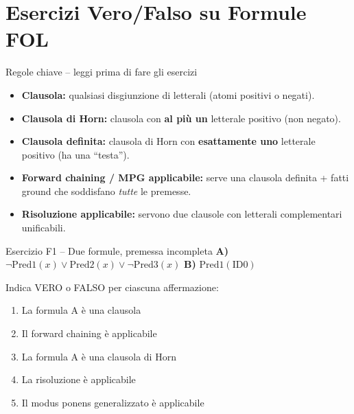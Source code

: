 \documentclass[12pt,a4paper]{article}
\begin{document}
\newpage

\section{Esercizi Vero/Falso su Formule FOL}

\begin{regola}{Regole chiave -- leggi prima di fare gli esercizi}
\begin{itemize}[noitemsep]
  \item \textbf{Clausola:} qualsiasi disgiunzione di letterali (atomi positivi o negati).
  \item \textbf{Clausola di Horn:} clausola con \textbf{al più un} letterale positivo (non negato).
  \item \textbf{Clausola definita:} clausola di Horn con \textbf{esattamente uno} letterale positivo (ha una ``testa'').
  \item \textbf{Forward chaining / MPG applicabile:} serve una clausola definita + fatti ground che soddisfano \emph{tutte} le premesse.
  \item \textbf{Risoluzione applicabile:} servono due clausole con letterali complementari unificabili.
\end{itemize}
\end{regola}

\begin{vfbox}{Esercizio F1 -- Due formule{,} premessa incompleta}
\textbf{A)} $\neg\text{Pred1}(x) \lor \text{Pred2}(x) \lor \neg\text{Pred3}(x)$ \qquad
\textbf{B)} $\text{Pred1}(\text{ID0})$
\smallskip

Indica VERO o FALSO per ciascuna affermazione:
\begin{enumerate}[label=\arabic*.]
  \item La formula A è una clausola \hfill \underline{\hspace{2cm}}
  \item Il forward chaining è applicabile \hfill \underline{\hspace{2cm}}
  \item La formula A è una clausola di Horn \hfill \underline{\hspace{2cm}}
  \item La risoluzione è applicabile \hfill \underline{\hspace{2cm}}
  \item Il modus ponens generalizzato è applicabile \hfill \underline{\hspace{2cm}}
\end{enumerate}
\end{vfbox}
\end{document}
